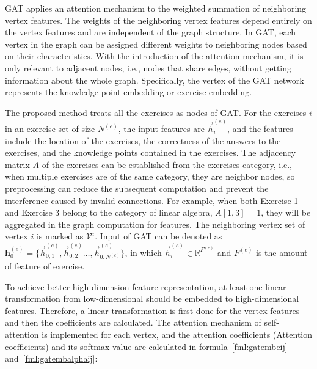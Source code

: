 GAT applies an attention mechanism to the weighted summation of neighboring vertex features. The weights of the neighboring vertex features depend entirely on the vertex features and are independent of the graph structure. In GAT, each vertex in the graph can be assigned different weights to neighboring nodes based on their characteristics. With the introduction of the attention mechanism, it is only relevant to adjacent nodes, i.e., nodes that share edges, without getting information about the whole graph. Specifically, the vertex of the GAT network represents the knowledge point embedding or exercise embedding.


The proposed method treats all the exercises as nodes of GAT. For the exercises \(i\) in an exercise set of size \(N^{(e)}\), the input features are \(\overrightarrow{h}^{(e)}_i\), and the features include the location of the exercises, the correctness of the answers to the exercises, and the knowledge points contained in the exercises. The adjacency matrix \(A\) of the exercises can be established from the exercises category, i.e., when multiple exercises are of the same category, they are neighbor nodes, so preprocessing can reduce the subsequent computation and prevent the interference caused by invalid connections. For example, when both Exercise 1 and Exercise 3 belong to the category of linear algebra, \(A[1,3]=1\), they will be aggregated in the graph computation for features. The neighboring vertex set of vertex \(i\) is marked as \(\mathcal{V}^i\). Input of GAT can be denoted as \(\mathbf{h}^{(e)}_0=\{\overrightarrow{h}^{(e)}_{0,1},\overrightarrow{h}^{(e)}_{0,2}\ldots,\overrightarrow{h}^{(e)}_{0,N^{(e)}}\} \), in which \(\overrightarrow{h}^{(e)}_i\in\mathbb{R}^{F^{(e)}}\) and \(F^{(e)}\) is the amount of feature of exercise.

To achieve better high dimension feature representation, at least one linear transformation from low-dimensional should be embedded to high-dimensional features. Therefore, a linear transformation is first done for the vertex features and then the coefficients are calculated. The attention mechanism of self-attention is implemented for each vertex, and the attention coefficients (Attention coefficients) and its softmax value are calculated in formula~\ref{fml:gatembeij} and~\ref{fml:gatembalphaij}:


